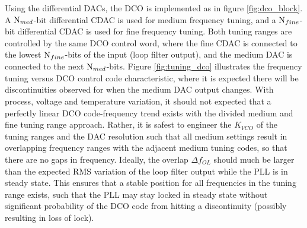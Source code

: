 	Using the differential DACs, the DCO is implemented as in figure \ref{fig:dco_block}. A $\textnormal{N}_{med}$-bit differential CDAC is used for medium frequency tuning, and a $\textnormal{N}_{fine}$-bit differential CDAC is used for fine frequency tuning. Both tuning ranges are controlled by the same DCO control word, where the fine CDAC is connected to the lowest $\textnormal{N}_{fine}$-bits of the input (loop filter output), and the medium DAC is connected to the next $\textnormal{N}_{med}$-bits. Figure \ref{fig:tuning_dco} illustrates the frequency tuning versus DCO control code characteristic, where it is expected there will be discontinuities observed for when the medium DAC output changes. With process, voltage and temperature variation, it should not expected that a perfectly linear DCO code-frequency trend exists with the divided medium and fine tuning range approach. Rather, it is safest to engineer the $K_{VCO}$ of the tuning ranges and the DAC resolution such that all medium settings result in overlapping frequency ranges with the adjacent medium tuning codes, so that there are no gaps in frequency. Ideally, the overlap $\Delta f_{OL}$ should much be larger than the expected RMS variation of the loop filter output while the PLL is in steady state. This ensures that a stable position for all frequencies in the tuning range exists, such that the PLL may stay locked in steady state without significant probability of the DCO code from hitting a discontinuity (possibly resulting in loss of lock).


